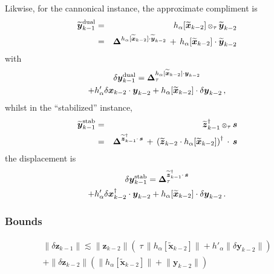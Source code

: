 \documentclass[letterpaper,twocolumn,amsmath,amsfont,amssymb,english,aps,jcp,preprintnumbers,groupaddress,nofootinbib,tightenlines]{revtex4}
\newcommand{\mat}[1]{\boldsymbol{#1}}
\newcommand{\ot}{ {\scriptstyle \otimes}_{ \tau } }
\begin{document}
Likwise,  for the cannonical instance, the approximate compliment is
\begin{eqnarray}
\widetilde{\mat{y}}^{\rm dual}_{k-1}&=&
h_\alpha [ \widetilde{\mat{x}}_{k-2}] \, \ot \, \widetilde{\mat{y}}_{k-2}  \\
&=&  \mat{\Delta}^{  h_\alpha[ \widetilde{\mat{x}}_{k-2}] \cdot \widetilde{\mat{y}}_{k-2} }  \, + \,
     h_\alpha[ \widetilde{\mat{x}}_{k-2}] \cdot \widetilde{\mat{y}}_{k-2}
\end{eqnarray}
with
\begin{multline}
\delta \mat{y}^{\rm dual}_{k-1}= \mat{\Delta}^{
h_\alpha [ \widetilde{\mat{x}}_{k-2}] \cdot \mat{y}_{k-2} }_\tau  \\ +
h'_\alpha \delta \mat{x}_{k-2} \cdot \mat{y}_{k-2}
+ h_\alpha [ \widetilde{\mat{x}}_{k-2}] \cdot \delta \mat{y}_{k-2} \, ,
\end{multline}
whilst in the ``stabilized'' instance,
\begin{eqnarray}
\widetilde{\mat{y}}^{\rm stab}_{k-1} &=& \widetilde{\mat{z}}^{\dagger}_{k-1} \, \ot \, \mat{s} \\
                                  &=& \mat{\Delta}^{\widetilde{\mat{z}}^\dagger_{k-1} \cdot \, \mat{s}} \, + \,
\left( \widetilde{\mat{z}}_{k-2} \cdot h_\alpha[ \widetilde{\mat{x}}_{k-2}] \right)^\dagger \, \cdot \, \mat{s}
\end{eqnarray}
the displacement is
\begin{multline}
\delta \mat{y}^{\rm stab}_{k-1}= \mat{\Delta}^{\widetilde{\mat{z}}^\dagger_{k-1} \cdot \, \mat{s}}_\tau  \\ +
h'_\alpha \delta \mat{x}^\dagger_{k-2} \cdot \mat{y}_{k-2}
+ h_\alpha [ \widetilde{\mat{x}}_{k-2}] \cdot \delta \mat{y}_{k-2}  \,.
\end{multline}

\subsubsection{Bounds}

\begin{multline}
\lVert \delta {\mat{z}}_{k-1} \rVert \lesssim
\lVert \mat{z}_{k-2} \rVert \left( \;  \tau \, \lVert h_\alpha \left[\widetilde{\mat{x}}_{k-2} \right]  \rVert
+ h'_\alpha \lVert \delta {\mat{y}}_{k-2} \rVert  \right)  \\ +
\lVert \delta {\mat{z}}_{k-2} \rVert  \left( \lVert h_\alpha \left[\widetilde{\mat{x}}_{k-2} \right]  \rVert +
\lVert  {\mat{y}}_{k-2} \rVert \right)
\end{multline}
\end{document}
